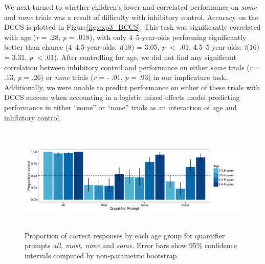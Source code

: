 \documentclass[man]{apa2}
\begin{document}
We next turned to whether children's lower and correlated performance on \emph{some} and \textit{none} trials was a result of difficulty with inhibitory control. Accuracy on the DCCS is plotted in Figure\ref{fig:exp3_DCCS}. This task was significantly correlated with age (\textit{r} = .28, \textit{p} = .018), with only 4--5-year-olds performing significantly better than chance (4--4.5-year-olds: \emph{t}(18) = 3.05, \emph{p} $<$ .01; 4.5--5-year-olds: \emph{t}(16) = 3.31, \emph{p} $< $.01). After controlling for age, we did not find any significant correlation between inhibitory control and performance on either \textit{some} trials (\textit{r} = .13, \textit{p} = .26) or \textit{none} trials (\textit{r} = - .01, \textit{p} = .93) in our implicature task. Additionally, we were unable to predict performance on either of these trials with DCCS success when accounting in a logistic mixed effects model predicting performance in either ``some'' or ``none'' trials as an interaction of age and inhibitory control. 

\begin{figure} 
 \begin{center} 
  \includegraphics[height=2in]{figures/exp3_GQright.pdf} 
  \caption{\label{fig:exp3_GQright} Proportion of correct responses by each age group for quantifier prompts \textit{all, most, none} and \textit{some}.  Error bars show 95\% confidence intervals computed by non-parametric bootstrap.} 
 \end{center} 
\end{figure}
\end{document}
